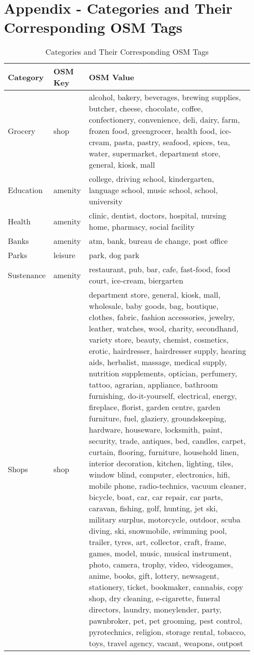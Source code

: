 \clearpage
\section{Appendix - Categories and Their Corresponding OSM Tags}
\label{app:categories_and_osm_tags}

\begin{table}[ht]
\centering
\caption{Categories and Their Corresponding OSM Tags}
\label{tab:categories}
\footnotesize
\begin{tabular}{|l|l|p{10cm}|}
\hline
\textbf{Category} & \textbf{OSM Key} & \textbf{OSM Value} \\ \hline
Grocery           & shop             & alcohol, bakery, beverages, brewing supplies, butcher, cheese, chocolate, coffee, confectionery, convenience, deli, dairy, farm, frozen food, greengrocer, health food, ice-cream, pasta, pastry, seafood, spices, tea, water, supermarket, department store, general, kiosk, mall \\ \hline
Education         & amenity          & college, driving school, kindergarten, language school, music school, school, university \\ \hline
Health            & amenity          & clinic, dentist, doctors, hospital, nursing home, pharmacy, social facility \\ \hline
Banks             & amenity          & atm, bank, bureau de change, post office \\ \hline
Parks             & leisure          & park, dog park \\ \hline
Sustenance        & amenity          & restaurant, pub, bar, cafe, fast-food, food court, ice-cream, biergarten \\ \hline
Shops             & shop             & department store, general, kiosk, mall, wholesale, baby goods, bag, boutique, clothes, fabric, fashion accessories, jewelry, leather, watches, wool, charity, secondhand, variety store, beauty, chemist, cosmetics, erotic, hairdresser, hairdresser supply, hearing aids, herbalist, massage, medical supply, nutrition supplements, optician, perfumery, tattoo, agrarian, appliance, bathroom furnishing, do-it-yourself, electrical, energy, fireplace, florist, garden centre, garden furniture, fuel, glaziery, groundskeeping, hardware, houseware, locksmith, paint, security, trade, antiques, bed, candles, carpet, curtain, flooring, furniture, household linen, interior decoration, kitchen, lighting, tiles, window blind, computer, electronics, hifi, mobile phone, radio-technics, vacuum cleaner, bicycle, boat, car, car repair, car parts, caravan, fishing, golf, hunting, jet ski, military surplus, motorcycle, outdoor, scuba diving, ski, snowmobile, swimming pool, trailer, tyres, art, collector, craft, frame, games, model, music, musical instrument, photo, camera, trophy, video, videogames, anime, books, gift, lottery, newsagent, stationery, ticket, bookmaker, cannabis, copy shop, dry cleaning, e-cigarette, funeral directors, laundry, moneylender, party, pawnbroker, pet, pet grooming, pest control, pyrotechnics, religion, storage rental, tobacco, toys, travel agency, vacant, weapons, outpost \\ \hline

\end{tabular}
\end{table}
